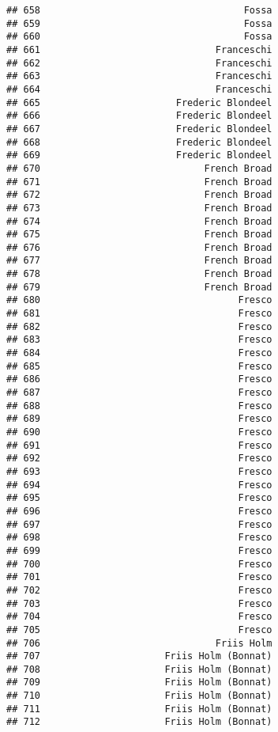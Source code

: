 \documentclass[
]{article}
\begin{document}
\begin{verbatim}
## 658                                    Fossa
## 659                                    Fossa
## 660                                    Fossa
## 661                               Franceschi
## 662                               Franceschi
## 663                               Franceschi
## 664                               Franceschi
## 665                        Frederic Blondeel
## 666                        Frederic Blondeel
## 667                        Frederic Blondeel
## 668                        Frederic Blondeel
## 669                        Frederic Blondeel
## 670                             French Broad
## 671                             French Broad
## 672                             French Broad
## 673                             French Broad
## 674                             French Broad
## 675                             French Broad
## 676                             French Broad
## 677                             French Broad
## 678                             French Broad
## 679                             French Broad
## 680                                   Fresco
## 681                                   Fresco
## 682                                   Fresco
## 683                                   Fresco
## 684                                   Fresco
## 685                                   Fresco
## 686                                   Fresco
## 687                                   Fresco
## 688                                   Fresco
## 689                                   Fresco
## 690                                   Fresco
## 691                                   Fresco
## 692                                   Fresco
## 693                                   Fresco
## 694                                   Fresco
## 695                                   Fresco
## 696                                   Fresco
## 697                                   Fresco
## 698                                   Fresco
## 699                                   Fresco
## 700                                   Fresco
## 701                                   Fresco
## 702                                   Fresco
## 703                                   Fresco
## 704                                   Fresco
## 705                                   Fresco
## 706                               Friis Holm
## 707                      Friis Holm (Bonnat)
## 708                      Friis Holm (Bonnat)
## 709                      Friis Holm (Bonnat)
## 710                      Friis Holm (Bonnat)
## 711                      Friis Holm (Bonnat)
## 712                      Friis Holm (Bonnat)

\end{verbatim}
\end{document}
